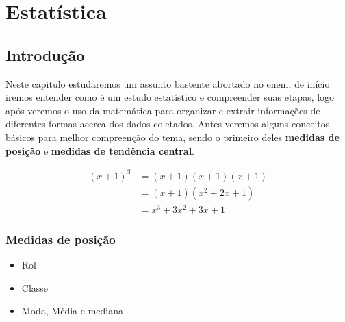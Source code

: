 \chapter{Estatística}
\section{Introdução}
Neste capitulo estudaremos um assunto bastente abortado no enem, de início iremos entender como é um estudo estatístico e compreender suas etapas, logo após veremos o uso da matemática para organizar e extrair informações de diferentes formas acerca dos dados coletados. Antes veremos alguns conceitos básicos para melhor compreenção do tema, sendo o primeiro deles \textbf{medidas de posição} e \textbf{medidas de tendência central}.

\begin{align*}
(x+1)^3 &= (x+1)(x+1)(x+1) \\
&= (x+1)(x^2 + 2x + 1) \\
&= x^3 + 3x^2 + 3x + 1
\end{align*}

\subsection{Medidas de posição}
\begin{definition}
	
\end{definition}
	\begin{itemize}
		\item Rol
		\item Classe
		\item Moda, Média e mediana 
	\end{itemize}